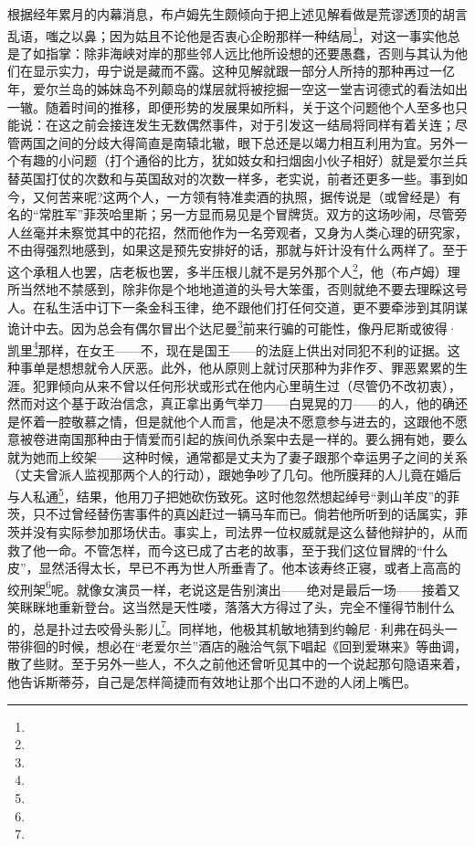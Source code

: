 \par 根据经年累月的内幕消息，布卢姆先生颇倾向于把上述见解看做是荒谬透顶的胡言乱语，嗤之以鼻；因为姑且不论他是否衷心企盼那样一种结局\footnote{}，对这一事实他总是了如指掌：除非海峡对岸的那些邻人远比他所设想的还要愚蠢，否则与其认为他们在显示实力，毋宁说是藏而不露。这种见解就跟一部分人所持的那种再过一亿年，爱尔兰岛的姊妹岛不列颠岛的煤层就将被挖掘一空这一堂吉诃德式的看法如出一辙。随着时间的推移，即便形势的发展果如所料，关于这个问题他个人至多也只能说：在这之前会接连发生无数偶然事件，对于引发这一结局将同样有着关连；尽管两国之间的分歧大得简直是南辕北辙，眼下总还是以竭力相互利用为宜。另外一个有趣的小问题（打个通俗的比方，犹如妓女和扫烟囱小伙子相好）就是爱尔兰兵替英国打仗的次数和与英国敌对的次数一样多，老实说，前者还更多一些。事到如今，又何苦来呢?这两个人，一方领有特准卖酒的执照，据传说是（或曾经是）有名的“常胜军”菲茨哈里斯；另一方显而易见是个冒牌货。双方的这场吵闹，尽管旁人丝毫并未察觉其中的花招，然而他作为一名旁观者，又身为人类心理的研究家，不由得强烈地感到，如果这是预先安排好的话，那就与奸计没有什么两样了。至于这个承租人也罢，店老板也罢，多半压根儿就不是另外那个人\footnote{}，他（布卢姆）理所当然地不禁感到，除非你是个地地道道的头号大笨蛋，否则就绝不要去理睬这号人。在私生活中订下一条金科玉律，绝不跟他们打任何交道，更不要牵涉到其阴谋诡计中去。因为总会有偶尔冒出个达尼曼\footnote{}前来行骗的可能性，像丹尼斯或彼得·凯里\footnote{}那样，在女王——不，现在是国王——的法庭上供出对同犯不利的证据。这种事单是想想就令人厌恶。此外，他从原则上就讨厌那种为非作歹、罪恶累累的生涯。犯罪倾向从来不曾以任何形状或形式在他内心里萌生过（尽管仍不改初衷），然而对这个基于政治信念，真正拿出勇气举刀——白晃晃的刀——的人，他的确还是怀着一腔敬慕之情，但是就他个人而言，他是决不愿意参与进去的，这跟他不愿意被卷进南国那种由于情爱而引起的族间仇杀案中去是一样的。要么拥有她，要么就为她而上绞架——这种时候，通常都是丈夫为了妻子跟那个幸运男子之间的关系（丈夫曾派人监视那两个人的行动），跟她争吵了几句。他所膜拜的人儿竟在婚后与人私通\footnote{}，结果，他用刀子把她砍伤致死。这时他忽然想起绰号“剥山羊皮”的菲茨，只不过曾经替伤害事件的真凶赶过一辆马车而已。倘若他所听到的话属实，菲茨并没有实际参加那场伏击。事实上，司法界一位权威就是这么替他辩护的，从而救了他一命。不管怎样，而今这已成了古老的故事，至于我们这位冒牌的“什么皮”，显然活得太长，早已不再为世人所垂青了。他本该寿终正寝，或者上高高的绞刑架\footnote{}呢。就像女演员一样，老说这是告别演出——绝对是最后一场——接着又笑眯眯地重新登台。这当然是天性喽，落落大方得过了头，完全不懂得节制什么的，总是扑过去咬骨头影儿\footnote{}。同样地，他极其机敏地猜到约翰尼·利弗在码头一带徘徊的时候，想必在“老爱尔兰”酒店的融洽气氛下唱起《回到爱琳来》等曲调，散了些财。至于另外一些人，不久之前他还曾听见其中的一个说起那句隐语来着，他告诉斯蒂芬，自己是怎样简捷而有效地让那个出口不逊的人闭上嘴巴。
